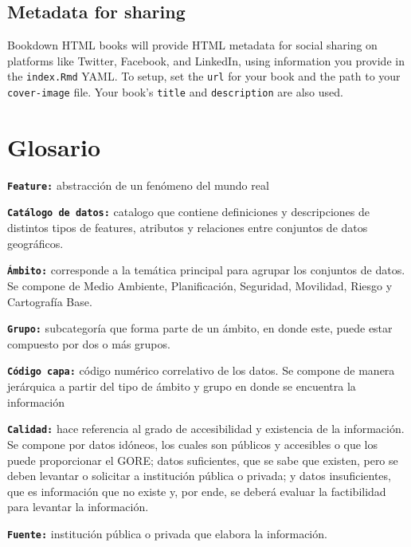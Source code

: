 \documentclass[
]{book}
\theoremstyle{definition}
\theoremstyle{definition}
\theoremstyle{definition}
\theoremstyle{definition}
\theoremstyle{remark}
\begin{document}
\hypertarget{metadata-for-sharing}{%
\section*{Metadata for sharing}\label{metadata-for-sharing}}

Bookdown HTML books will provide HTML metadata for social sharing on platforms like Twitter, Facebook, and LinkedIn, using information you provide in the \texttt{index.Rmd} YAML. To setup, set the \texttt{url} for your book and the path to your \texttt{cover-image} file. Your book's \texttt{title} and \texttt{description} are also used.

\hypertarget{glosario}{%
\chapter*{Glosario}\label{glosario}}

\textbf{\texttt{Feature:}} abstracción de un fenómeno del mundo real

\textbf{\texttt{Catálogo\ de\ datos:}} catalogo que contiene definiciones y descripciones de distintos tipos de features, atributos y relaciones entre conjuntos de datos geográficos.

\textbf{\texttt{Ámbito:}} corresponde a la temática principal para agrupar los conjuntos de datos. Se compone de Medio Ambiente, Planificación, Seguridad, Movilidad, Riesgo y Cartografía Base.

\textbf{\texttt{Grupo:}} subcategoría que forma parte de un ámbito, en donde este, puede estar compuesto por dos o más grupos.

\textbf{\texttt{Código\ capa:}} código numérico correlativo de los datos. Se compone de manera jerárquica a partir del tipo de ámbito y grupo en donde se encuentra la información

\textbf{\texttt{Calidad:}} hace referencia al grado de accesibilidad y existencia de la información. Se compone por datos idóneos, los cuales son públicos y accesibles o que los puede proporcionar el GORE; datos suficientes, que se sabe que existen, pero se deben levantar o solicitar a institución pública o privada; y datos insuficientes, que es información que no existe y, por ende, se deberá evaluar la factibilidad para levantar la información.

\textbf{\texttt{Fuente:}} institución pública o privada que elabora la información.
\end{document}
